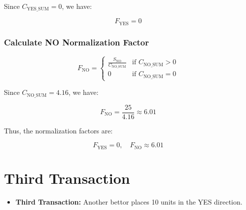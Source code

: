 \documentclass{article}
\begin{document}
Since \( C_{\text{YES\_SUM}} = 0 \), we have:

\[
F_{\text{YES}} = 0
\]

\subsubsection*{Calculate NO Normalization Factor}

\[
F_{\text{NO}} =
\begin{cases}
      \frac{S_{\text{NO}}}{C_{\text{NO\_SUM}}} & \text{if } C_{\text{NO\_SUM}} > 0 \\
      0 & \text{if } C_{\text{NO\_SUM}} = 0
   \end{cases}
\]

Since \( C_{\text{NO\_SUM}} = 4.16 \), we have:

\[
F_{\text{NO}} = \frac{25}{4.16} \approx 6.01
\]

Thus, the normalization factors are:

\[
F_{\text{YES}} = 0, \quad F_{\text{NO}} \approx 6.01
\]

\begin{center}
\end{center}


\newpage

\section{Third Transaction}

\begin{itemize}
    \item \textbf{Third Transaction:} Another bettor places 10 units in the YES direction.
\end{itemize}
\end{document}
